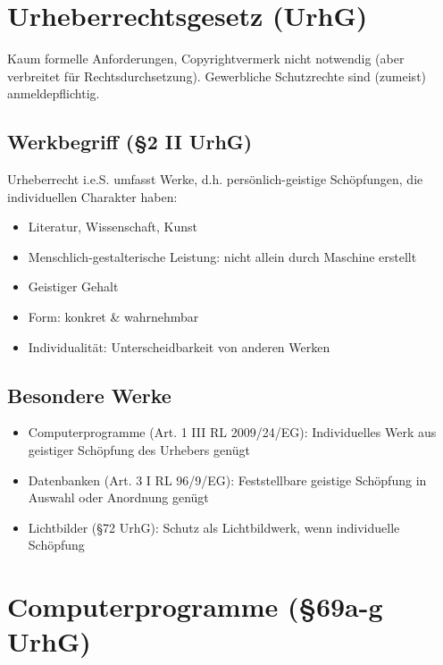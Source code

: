 \documentclass{article}
\begin{document}




\section{Urheberrechtsgesetz (UrhG)}


Kaum formelle Anforderungen, Copyrightvermerk nicht notwendig (aber verbreitet für Rechtsdurchsetzung). Gewerbliche Schutzrechte sind (zumeist) anmeldepflichtig.

\subsection{Werkbegriff (§2 II UrhG)}
Urheberrecht i.e.S. umfasst Werke, d.h. persönlich-geistige Schöpfungen, die individuellen Charakter haben:
\begin{itemize}
  \item Literatur, Wissenschaft, Kunst
  \item Menschlich-gestalterische Leistung: nicht allein durch Maschine erstellt
  \item Geistiger Gehalt
  \item Form: konkret \& wahrnehmbar
  \item Individualität: Unterscheidbarkeit von anderen Werken
\end{itemize}

\subsection{Besondere Werke}
\begin{itemize}
  \item Computerprogramme (Art. 1 III RL 2009/24/EG): Individuelles Werk aus geistiger Schöpfung des Urhebers genügt
  \item Datenbanken (Art. 3 I RL 96/9/EG): Feststellbare geistige Schöpfung in Auswahl oder Anordnung genügt
  \item Lichtbilder (§72 UrhG): Schutz als Lichtbildwerk, wenn individuelle Schöpfung
\end{itemize}

\section{Computerprogramme (§69a-g UrhG)}
\end{document}
